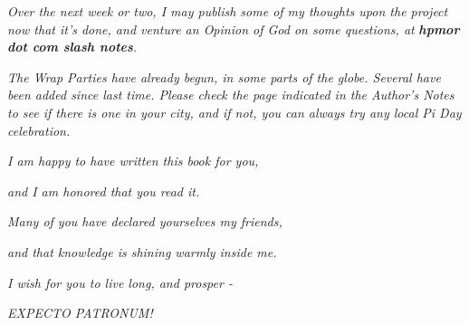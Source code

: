 \emph{Over the next week or two, I may publish some of my thoughts upon the project now that it's done, and venture an Opinion of God on some questions, at} \emph{\textbf{hpmor dot com slash notes}}\emph{.}

\emph{The Wrap Parties have already begun, in some parts of the globe. Several have been added since last time. Please check the page indicated in the Author's Notes to see if there is one in your city, and if not, you can always try any local Pi Day celebration.}

\emph{I am happy to have written this book for you,}

\emph{and I am honored that you read it.}

\emph{Many of you have declared yourselves my friends,}

\emph{and that knowledge is shining warmly inside me.}

\emph{I wish for you to live long, and prosper -}

\emph{EXPECTO PATRONUM!}
